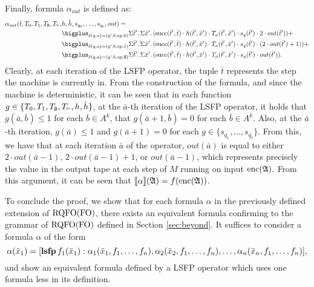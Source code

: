 Finally, formula $\alpha_{out}$ is defined as:
\begin{align*}
\alpha_{out}(\bar{t},T_0,T_1,T_{\ttB},T_{\vdash},&h,\hat{h},s_{q_0},\ldots,s_{q_{\ell}},out) =\\
&\bigplus_{\delta(q,a) = (q',b,op,0)}\sa{\bar{t}'}\sa{\bar{x}'}(\successor(\bar{t}',\bar{t}) \mult h(\bar{t}',\bar{x}') \mult T_a(\bar{t}',\bar{x}') \mult s_{q}(\bar{t}') \mult 2\mult out(\bar{t}')) + \\
&\bigplus_{\delta(q,a) = (q',b,op,1)}\sa{\bar{t}'}\sa{\bar{x}'}(\successor(\bar{t}',\bar{t}) \mult h(\bar{t}',\bar{x}') \mult T_a(\bar{t}',\bar{x}') \mult s_{q}(\bar{t}') \mult (2\mult out(\bar{t}')+1)) + \\ 
&\bigplus_{\delta(q,a) = (q',b,op,\emptyset)}\sa{\bar{t}'}\sa{\bar{x}'}(\successor(\bar{t}',\bar{t}) \mult h(\bar{t}',\bar{x}') \mult T_a(\bar{t}',\bar{x}') \mult s_{q}(\bar{t}') \mult out(\bar{t}')).
\end{align*}
Clearly, at each iteration of the LSFP operator, the tuple $\bar{t}$ represents the step the machine is currently in. From the construction of the formula, and since the machine is deterministic, it can be seen that in each function $g\in\{T_0,T_1,T_{\mathtt{B}},T_{\vdash},h,\hat{h}\}$, at the $\bar{a}$-th iteration of the LSFP operator, it holds that $g(\bar{a},\bar{b}) \leq 1$ for each $\bar{b}\in A^k$, that $g(\bar{a}+1,\bar{b}) = 0$ for each $\bar{b}\in A^k$. Also, at the $\bar{a}$-th iteration, $g(\bar{a}) \leq 1$ and $g(\bar{a}+1) = 0$ for each $g\in\{s_{q_1},\ldots,s_{q_{\ell}}\}$. From this, we have that at each iteration $\bar{a}$ of the operator, $out(\bar{a})$ is equal to either $2\cdot out(\bar{a}-1)$, $2\cdot out(\bar{a}-1) + 1$, or $out(\bar{a}-1)$, which represents precisely the value in the output tape at each step of $M$ running on input ${\rm enc}(\mathfrak{A})$. From this argument, it can be seen that ${\llbracket{}{\alpha}\rrbracket}(\mathfrak{A}) = f({\rm enc}(\mathfrak{A}))$.

\medskip

To conclude the proof, we show that for each formula $\alpha$ in the previously defined extension of ${\rm RQFO}({\rm FO})$, there exists an equivalent formula confirming to the grammar of ${\rm RQFO}({\rm FO})$ defined in Section \ref{sec:beyond}. It suffices to consider a formula $\alpha$ of the form 
$$
\alpha(\bar{x}_1) = [{\bf lsfp} \, f_1(\bar{x}_1): \alpha_1(\bar{x}_1,f_1,\ldots,f_n),\alpha_2(\bar{x}_2,f_1,\ldots,f_n),\ldots,\alpha_n(\bar{x}_n,f_1,\ldots,f_n)],
$$
and show an equivalent formula defined by a LSFP operator which uses one formula less in its definition.

